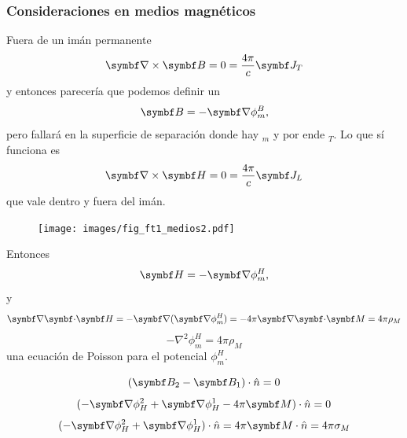 \documentclass[10pt,oneside]{CBFT_book}
\begin{document}
\subsubsection{Consideraciones en medios magnéticos}

Fuera de un imán permanente 
\[
	\rotorm{B} = 0 = \frac{4\pi}{c}\vb{J}_T
\]
y entonces parecería que podemos definir un
\[
	\vb{B} = -\Nabla \phi_m^B,
\]
pero fallará en la superficie de separación donde hay $_m$ y por ende $_T$. Lo que sí funciona
es
\[
	\rotorm{H} = 0 = \frac{4\pi}{c}\vb{J}_L
\]
que vale dentro y fuera del imán.
\begin{figure}[htb]
	\begin{center}
	\texttt{[image: images/fig\_ft1\_medios2.pdf]}	 
	\end{center}
	\caption{}
\end{figure}

Entonces
\[
	\vb{H} = -\Nabla \phi_m^H,
\]
y
\[
	\divem{H} = -\Nabla(\Nabla \phi^H_m ) = -4\pi \divem{M} = 4\pi\rho_M
\]
\[
	-\nabla^2 \phi_m^H = 4\pi\rho_M
\]
una ecuación de Poisson para el potencial $\phi_m^H$.

\[
	(\vb{B}_2 - \vb{B}_1)\cdot\hat{n} = 0
\]
\[
	(-\Nabla \phi^2_H + \Nabla \phi^1_H - 4\pi \vb{M})\cdot\hat{n} = 0
\]
\[
	(-\Nabla \phi^2_H + \Nabla \phi^1_H )\cdot\hat{n} = 4\pi \vb{M}\cdot\hat{n} = 4\pi \sigma_M
\]
\end{document}
